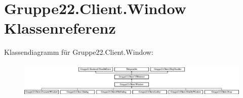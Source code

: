\hypertarget{class_gruppe22_1_1_client_1_1_window}{\section{Gruppe22.\-Client.\-Window Klassenreferenz}
\label{class_gruppe22_1_1_client_1_1_window}
}
Klassendiagramm für Gruppe22.\-Client.\-Window\-:\begin{figure}[H]
\begin{center}
\leavevmode
\includegraphics[height=1.720430cm]{class_gruppe22_1_1_client_1_1_window}
\end{center}
\end{figure}
